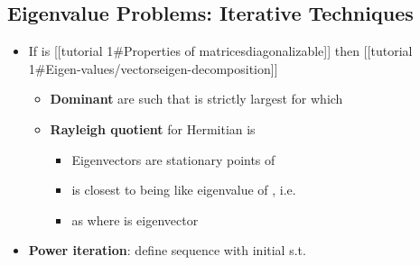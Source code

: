 \subsection*{Eigenvalue Problems: Iterative
Techniques}

\begin{itemize}

\item
  If  is {[}{[}tutorial 1\#Properties of
  matrices\textbar diagonalizable{]}{]} then {[}{[}tutorial
  1\#Eigen-values/vectors\textbar eigen-decomposition{]}{]}

  \begin{itemize}
  
  \item
    \textbf{Dominant}  are such that
     is strictly largest for which
  \item
    \textbf{Rayleigh quotient} for Hermitian  is

    \begin{itemize}
    
    \item
      Eigenvectors are stationary points of 
    \item
       is closest to being like eigenvalue
      of ,
      i.e.~
    \item
      as  where \iMbox{\nu} is eigenvector
    \end{itemize}
  \end{itemize}
\item
  \textbf{Power iteration}: define sequence
  with initial  s.t.

  \begin{itemize}
  

\end{itemize}
\end{itemize}
